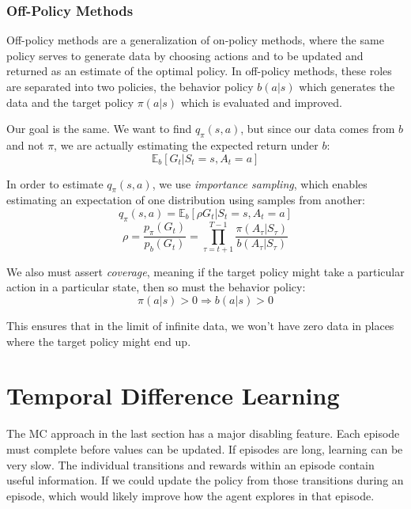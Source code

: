 \documentclass{article}
\begin{document}
\subsubsection{Off-Policy Methods}
Off-policy methods are a generalization of on-policy methods, where the same policy serves to generate data by choosing actions and to 
be updated and returned as an estimate of the optimal policy. In off-policy methods, these roles are separated into two policies, the behavior
policy $b(a|s)$ which generates the data and the target policy $\pi(a|s)$ which is evaluated and improved.

Our goal is the same. We want to find $q_\pi(s,a)$, but since our data comes from $b$ and not $\pi$, we are actually estimating the expected 
return under $b$:
\begin{equation}
  \mathbb{E}_b[G_t | S_t = s, A_t = a]
\end{equation}

In order to estimate $q_\pi(s,a)$, we use \emph{importance sampling}, which enables estimating an expectation of one distribution using samples from another:
\begin{equation}
  q_\pi(s,a) = \mathbb{E}_b[\rho G_t|S_t=s,A_t=a]
\end{equation}
\begin{equation}
  \rho = \frac{p_\pi(G_t)}{p_b(G_t)} = \prod_{\tau=t+1}^{T-1} \frac{\pi(A_\tau|S_\tau)}{b(A_\tau|S_\tau)}
\end{equation}

We also must assert \emph{coverage}, meaning if the target policy might take a particular action in a particular state, then so must the behavior policy:
\begin{equation}
  \pi(a|s) > 0 \Rightarrow b(a|s) > 0
\end{equation}

This ensures that in the limit of infinite data, we won't have zero data in places where the target policy might end up.



\section{Temporal Difference Learning}
The MC approach in the last section has a major disabling feature. Each episode must complete before values can be updated. 
If episodes are long, learning can be very slow. The individual transitions and rewards within an episode contain useful information.
If we could update the policy from those transitions during an episode, which would likely improve how the agent explores in that episode.
\end{document}

